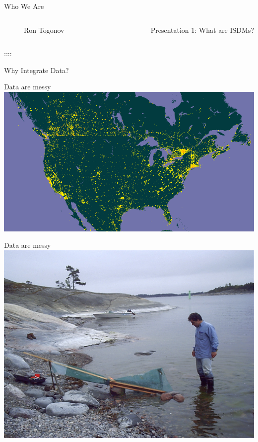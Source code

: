 \documentclass[
  ignorenonframetext,
]{beamer}
\begin{document}
\begin{frame}
\begin{block}{Who We Are}
\begin{columns}[T]
\begin{column}{0.25\textwidth}
\begin{figure}[H]
{}

\caption{Ron Togonov}

\end{figure}%
\end{column}

\begin{frame}{Presentation 1: What are ISDMs?}
\label{presentation-1-what-are-isdms}
\end{frame}
\end{columns}

::::
\end{block}
\end{frame}

\begin{frame}{Why Integrate Data?}
\label{why-integrate-data}
\begin{block}{Data are messy}
\label{data-are-messy}
\includegraphics{Images/LepsNA.gif}
\end{block}

\begin{block}{Data are messy}
\label{data-are-messy-1}
\includegraphics{Images/JohanTrap.JPG}
\end{block}


\end{frame}
\end{document}
